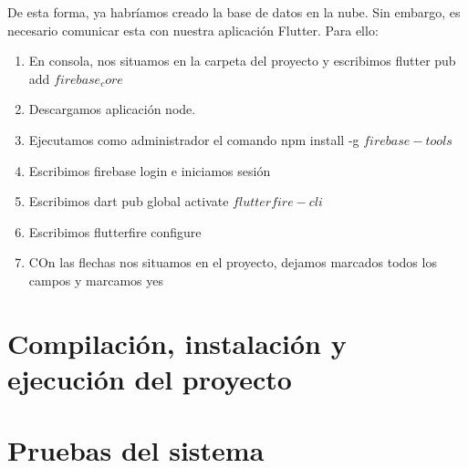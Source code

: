 	De esta forma, ya habríamos creado la base de datos en la nube. Sin embargo, es necesario comunicar esta con nuestra aplicación Flutter. Para ello:
	\begin{enumerate}
		\item En consola, nos situamos en la carpeta del proyecto y escribimos flutter pub add $firebase_core$
		\item Descargamos aplicación node.
		\item Ejecutamos como administrador el comando npm install -g $firebase-tools$
		\item Escribimos firebase login e iniciamos sesión
		\item Escribimos dart pub global activate $flutterfire-cli$
		\item Escribimos flutterfire configure
		\item COn las flechas nos situamos en el proyecto, dejamos marcados todos los campos y marcamos yes
	\end{enumerate}

\section{Compilación, instalación y ejecución del proyecto}

	

\section{Pruebas del sistema}
